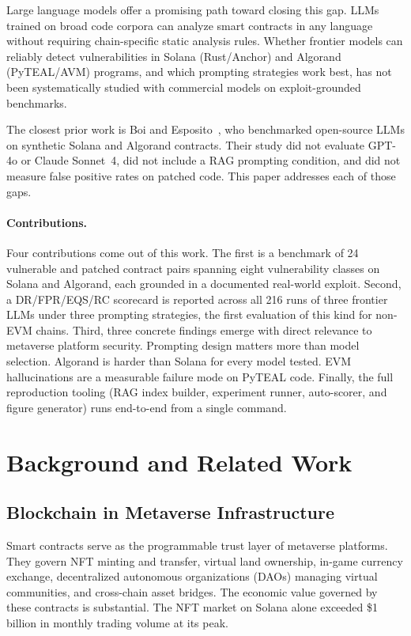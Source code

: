 \documentclass[runningheads]{llncs}
\begin{document}
Large language models offer a promising path toward closing this gap.
LLMs trained on broad code corpora can analyze smart contracts in any language
without requiring chain-specific static analysis rules.
Whether frontier models can reliably detect vulnerabilities in Solana
(Rust/Anchor) and Algorand (PyTEAL/AVM) programs, and which prompting
strategies work best, has not been systematically studied with commercial
models on exploit-grounded benchmarks.

The closest prior work is Boi and Esposito~\cite{boi2025prompt}, who
benchmarked open-source LLMs on synthetic Solana and Algorand contracts.
Their study did not evaluate GPT-4o or Claude Sonnet~4, did not include a RAG
prompting condition, and did not measure false positive rates on patched code.
This paper addresses each of those gaps.

\paragraph{Contributions.}
Four contributions come out of this work.
The first is a benchmark of 24 vulnerable and patched contract pairs spanning
eight vulnerability classes on Solana and Algorand, each grounded in a
documented real-world exploit.
Second, a DR/FPR/EQS/RC scorecard is reported across all 216 runs of three
frontier LLMs under three prompting strategies, the first evaluation of this
kind for non-EVM chains.
Third, three concrete findings emerge with direct relevance to metaverse platform
security. Prompting design matters more than model selection. Algorand is harder
than Solana for every model tested. EVM hallucinations are a measurable failure
mode on PyTEAL code.
Finally, the full reproduction tooling (RAG index builder, experiment runner,
auto-scorer, and figure generator) runs end-to-end from a single command.

\section{Background and Related Work}
\label{sec:background}

\subsection{Blockchain in Metaverse Infrastructure}

Smart contracts serve as the programmable trust layer of metaverse platforms.
They govern NFT minting and transfer, virtual land ownership, in-game currency
exchange, decentralized autonomous organizations (DAOs) managing virtual
communities, and cross-chain asset bridges.
The economic value governed by these contracts is substantial. The NFT market
on Solana alone exceeded \$1 billion in monthly trading volume at its peak.
\end{document}
